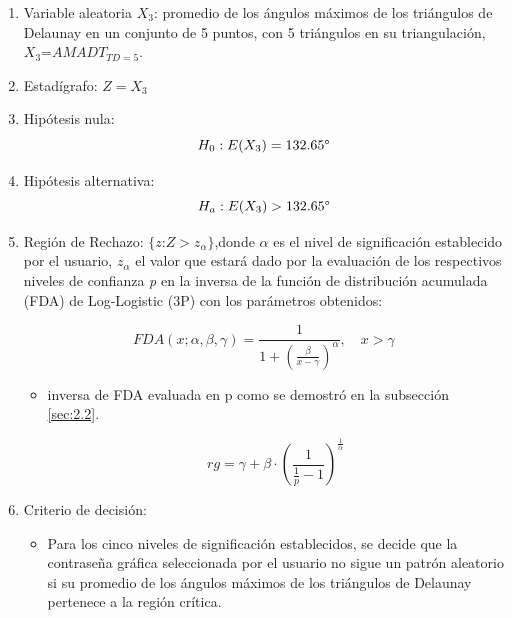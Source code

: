 \documentclass[12pt]{report}
\begin{document}
\begin{enumerate}
	\item Variable aleatoria $X_3$: promedio de los ángulos máximos de los triángulos de Delaunay en un conjunto de 5 puntos, con 5 triángulos en su triangulación, $X_3$=$AMADT_{TD=5}$.
	\item Estadígrafo: $Z=X_3$
	
	\item Hipótesis nula: \[H_0:E(X_3)=132.65\degree\]
	
	
	\item Hipótesis alternativa: \[H_a:E(X_3)>132.65\degree\]
	
	\item  Región de Rechazo: $\{z$:$Z>z_\alpha\}$,donde $\alpha$ es el nivel de significación establecido por el usuario,  $z_\alpha$  el valor que estará dado por la evaluación de los respectivos niveles de confianza \textit{p} en la  inversa de la función de distribución acumulada (FDA) de Log-Logistic (3P) con los parámetros obtenidos: 
	
	\[
	FDA(x; \alpha, \beta, \gamma) = \frac{1}{1 + \left( \frac{\beta}{x - \gamma} \right)^\alpha}, \quad x > \gamma
	\]
	\begin{itemize}
		\item inversa de FDA evaluada en p como se demostró en la subsección \ref{sec:2.2}.
		
	
		\[
		rg = \gamma + \beta \cdot \left( \frac{1}{\frac{1}{p}-1} \right)^{\frac{1}{\alpha}}
		\]
		
	\end{itemize}
	\item Criterio de decisión:
	\begin{itemize}
		\item Para los cinco niveles de significación establecidos, se decide que la contraseña gráfica seleccionada por el usuario no sigue un patrón aleatorio si su promedio de los ángulos máximos de los triángulos de Delaunay  pertenece a la región crítica. 
	\end{itemize}
\end{enumerate}
\end{document}

